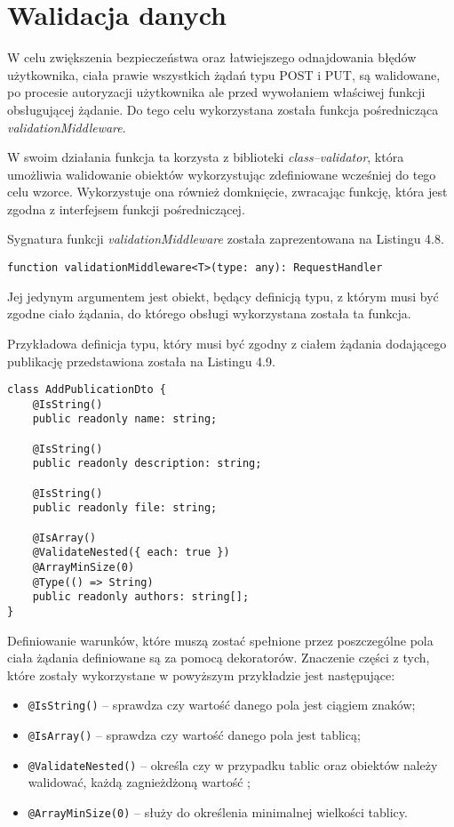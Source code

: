 \documentclass[a4paper,12pt,twoside,openany]{report}
\begin{document}
\section{Walidacja danych}
W celu zwiększenia bezpieczeństwa oraz łatwiejszego odnajdowania błędów użytkownika, ciała prawie wszystkich żądań typu POST i PUT, są walidowane, po procesie autoryzacji użytkownika ale przed wywołaniem właściwej funkcji obsługującej żądanie. Do tego celu wykorzystana została funkcja pośrednicząca \textit{validationMiddleware}. 

W swoim działania funkcja ta korzysta z biblioteki \textit{class--validator}, która umożliwia walidowanie obiektów wykorzystując zdefiniowane wcześniej do tego celu wzorce. Wykorzystuje ona również domknięcie, zwracając funkcję, która jest zgodna z interfejsem funkcji pośredniczącej.

Sygnatura funkcji \textit{validationMiddleware} została zaprezentowana na Listingu 4.8. 

\begin{lstlisting}[caption=Sygnatura funkcji validationMiddleware,label=code1,captionpos=b]
function validationMiddleware<T>(type: any): RequestHandler
\end{lstlisting}
Jej jedynym argumentem jest obiekt, będący definicją typu, z którym musi być zgodne ciało żądania, do którego obsługi wykorzystana została ta funkcja.

Przykładowa definicja typu, który musi być zgodny z ciałem żądania dodającego publikację przedstawiona została na Listingu 4.9.
\begin{lstlisting}[caption=Klasa AddPublicationDto,label=code1,captionpos=b]
class AddPublicationDto {
	@IsString()
	public readonly name: string;
	
	@IsString()
	public readonly description: string;
	
	@IsString()
	public readonly file: string;
	
	@IsArray()
	@ValidateNested({ each: true })
	@ArrayMinSize(0)
	@Type(() => String)        
	public readonly authors: string[];
}
\end{lstlisting} 
\pagebreak

Definiowanie warunków, które muszą zostać spełnione przez poszczególne pola ciała żądania definiowane są za pomocą dekoratorów. Znaczenie części z tych, które zostały wykorzystane w powyższym przykładzie jest następujące: 
\begin{itemize}
	\item \verb|@IsString()| -- sprawdza czy wartość danego pola jest ciągiem znaków;
	\item \verb|@IsArray()| -- sprawdza czy wartość danego pola jest tablicą; 
	\item \verb|@ValidateNested()| -- określa czy w przypadku tablic oraz obiektów należy walidować, każdą zagnieżdżoną wartość ;
	\item \verb|@ArrayMinSize(0)| -- służy do określenia minimalnej wielkości tablicy.
\end{itemize}
\end{document}
